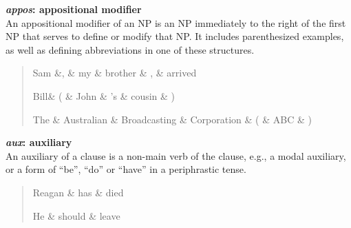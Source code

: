 \documentclass[11pt,letterpaper]{article}
\begin{document}
\noindent\textbf{\emph{appos}: appositional modifier}\\
An appositional modifier of an NP is an NP immediately to the right of
the first NP that serves to define or modify that NP. It includes
parenthesized examples, as well as defining abbreviations in one of
these structures.
\begin{quote}
\begin{dependency}
   \begin{deptext}[column sep=0.2em]
      Sam \&, \& my \& brother \& , \& arrived \\
   \end{deptext}
\end{dependency}
\hspace*{1in}
\begin{dependency}
   \begin{deptext}[column sep=0.2em]
      Bill\& ( \& John \& 's \& cousin \& ) \\
   \end{deptext}
\end{dependency}

\medskip

\begin{dependency}
   \begin{deptext}[column sep=0.2em]
      The \& Australian \& Broadcasting \& Corporation \& ( \& ABC \& ) \\
   \end{deptext}
\end{dependency}
\end{quote}

\noindent \textbf{\emph{aux}: auxiliary}\\
An auxiliary of a clause is a non-main verb of the clause, e.g., a
modal auxiliary, or a form of ``be'', ``do'' or ``have'' in a periphrastic tense.
\begin{quote}
\begin{dependency}
   \begin{deptext}[column sep=0.25cm]
      Reagan \& has \& died \\
   \end{deptext}
\end{dependency}
\hspace*{1in}
\begin{dependency}
   \begin{deptext}[column sep=0.25cm]
      He \& should \& leave \\
   \end{deptext}
\end{dependency}
\end{quote}
\end{document}
